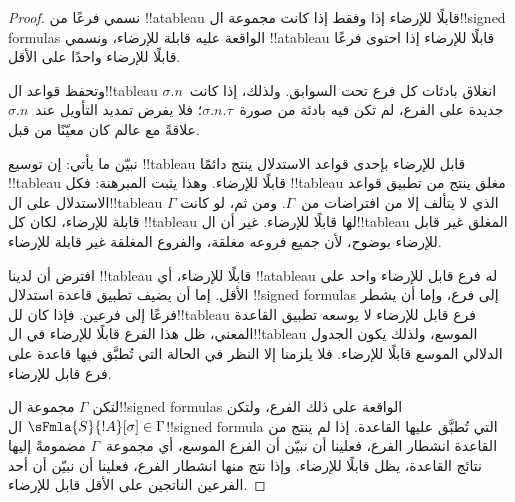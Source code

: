 \documentclass[../../../include/open-logic-section]{subfiles}
\begin{document}
\begin{proof}
نسمي فرعًا من !!a{tableau} قابلًا للإرضاء إذا وفقط إذا كانت مجموعة
ال!!{signed formula}s الواقعة عليه قابلة للإرضاء، ونسمي !!a{tableau}
قابلًا للإرضاء إذا احتوى فرعًا قابلًا للإرضاء واحدًا على الأقل.

وتحفظ قواعد ال!!{tableau} انغلاق بادئات كل فرع تحت السوابق. ولذلك، إذا
كانت~$\sigma.n$ جديدة على الفرع، لم تكن فيه بادئة من صورة~$\sigma.n.\tau$؛
فلا يفرض تمديد التأويل عند~$\sigma.n$ علاقةً مع عالم كان معيّنًا من قبل.

نبيّن ما يأتي: إن توسيع !!{tableau} قابل للإرضاء بإحدى قواعد الاستدلال
ينتج دائمًا !!{tableau} قابلًا للإرضاء. وهذا يثبت المبرهنة: فكل
!!{tableau} مغلق ينتج من تطبيق قواعد الاستدلال على ال!!{tableau} الذي
لا يتألف إلا من افتراضات من~$\Gamma$. ومن ثم، لو كانت $\Gamma$ قابلة
للإرضاء، لكان كل !!{tableau} لها قابلًا للإرضاء. غير أن ال!!{tableau}
المغلق غير قابل للإرضاء بوضوح، لأن جميع فروعه مغلقة، والفروع المغلقة
غير قابلة للإرضاء.

افترض أن لدينا !!{tableau} قابلًا للإرضاء، أي !!a{tableau} له فرع
قابل للإرضاء واحد على الأقل. إما أن يضيف تطبيق قاعدة استدلال
!!{signed formula}s إلى فرع، وإما أن يشطر فرعًا إلى فرعين. فإذا كان
لل!!{tableau} فرع قابل للإرضاء لا يوسعه تطبيق القاعدة المعني، ظل هذا
الفرع قابلًا للإرضاء في ال!!{tableau} الموسع، ولذلك يكون الجدول الدلالي
الموسع قابلًا للإرضاء. فلا يلزمنا إلا النظر في الحالة التي تُطبَّق
فيها قاعدة على فرع قابل للإرضاء.

لتكن $\Gamma$ مجموعة ال!!{signed formula}s الواقعة على ذلك الفرع،
ولتكن $\sFmla{S}{!A}[\sigma] \in \Gamma$ ال!!{signed formula} التي
تُطبَّق عليها القاعدة. إذا لم ينتج من القاعدة انشطار الفرع، فعلينا أن
  نبيّن أن الفرع الموسع، أي مجموعة~$\Gamma$ مضمومةً إليها نتائج القاعدة، يظل
قابلًا للإرضاء. وإذا نتج منها انشطار الفرع، فعلينا أن نبيّن أن أحد
الفرعين الناتجين على الأقل قابل للإرضاء.


\end{proof}
\end{document}
